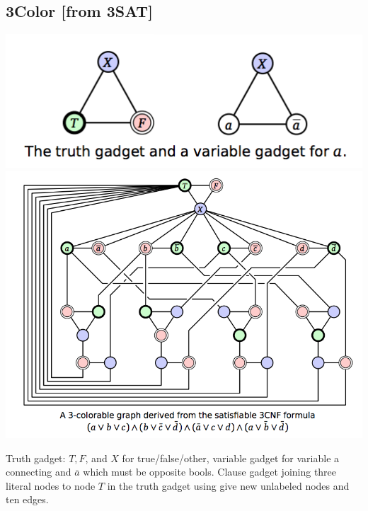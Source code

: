 \subsection{3Color [from 3SAT]}
\includegraphics[width=\linewidth]{images/truthgadget.png}
\includegraphics[width=\linewidth]{images/3color.png}

Truth gadget: $T,F$, and $X$ for true/false/other, variable gadget for variable a connecting and $\overbar{a}$ which must be opposite bools. Clause gadget joining three literal nodes to node $T$ in the truth gadget using give new unlabeled nodes and ten edges.